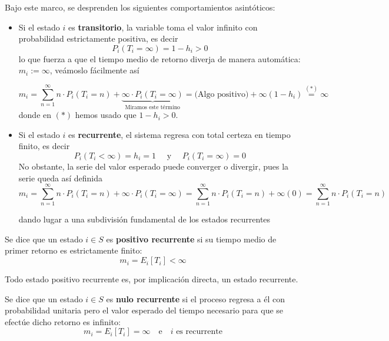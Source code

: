 \noindent
Bajo este marco, se desprenden los siguientes comportamientos asintóticos:
\begin{itemize}
    \item Si el estado $i$ es \textbf{transitorio}, la variable toma el valor infinito con probabilidad estrictamente positiva, es decir
    $$P_i(T_i = \infty) = 1 - h_i > 0$$ 
    lo que fuerza a que el tiempo medio de retorno diverja de manera automática: $m_i := \infty$, veámoslo fácilmente así

    \begin{equation*}
        m_i = \sum_{n=1}^{\infty} n \cdot P_i(T_i = n) + \underbrace{\infty \cdot P_i(T_i = \infty)}_{\text{Miramos este término}} =\text{(Algo positivo)} + \infty(1-h_i) \overset{(*)}{=} \infty 
    \end{equation*}
    donde en $(*)$ hemos usado que $1-h_i > 0$.
    \item Si el estado $i$ es \textbf{recurrente}, el sistema regresa con total certeza en tiempo finito, es decir
    $$P_i(T_i < \infty) = h_i = 1 \quad \text{ y } \quad P_i(T_i=\infty)=0$$
    No obstante, la serie del valor esperado puede converger o divergir, pues la serie queda así definida
    \begin{equation*}
        m_i = \sum_{n=1}^{\infty} n \cdot P_i(T_i = n) + \infty \cdot P_i(T_i = \infty) =\sum_{n=1}^{\infty} n \cdot P_i(T_i = n) + \infty(0) = \sum_{n=1}^{\infty} n \cdot P_i(T_i = n)
    \end{equation*}
    
    dando lugar a una subdivisión fundamental de los estados recurrentes
\end{itemize}

\begin{definicion}
    Se dice que un estado $i \in S$ es \textbf{positivo recurrente} si su tiempo medio de primer retorno es estrictamente finito:
    \[
    m_i = E_i[T_i] < \infty
    \]
\end{definicion}
\begin{observacion}
    Todo estado positivo recurrente es, por implicación directa, un estado recurrente.
\end{observacion}

\begin{definicion}
    Se dice que un estado $i \in S$ es \textbf{nulo recurrente} si el proceso regresa a él con probabilidad unitaria pero el valor esperado del tiempo necesario para que se efectúe dicho retorno es infinito:
    \[
    m_i = E_i[T_i] = \infty \quad \text{e} \quad i \text{ es recurrente}
    \]
\end{definicion}


